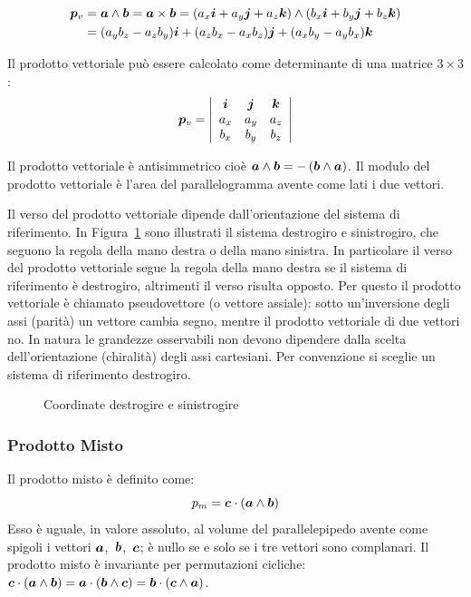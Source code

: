 \begin{align*}
  \boldsymbol{p}_v & =\boldsymbol{a} \wedge \boldsymbol{b}=\boldsymbol{a} \times \boldsymbol{b}=(a_x\boldsymbol{i}+a_y\boldsymbol{j}+a_z\boldsymbol{k})\wedge(b_x\boldsymbol{i}+b_y\boldsymbol{j}+b_z\boldsymbol{k})                                                                       \\
          & =(a_yb_z-a_zb_y)\boldsymbol{i}+(a_zb_x-a_xb_z)\boldsymbol{j}+(a_xb_y-a_yb_x)\boldsymbol{k}
\end{align*}

Il prodotto vettoriale può essere calcolato come determinante di una matrice $3\times 3$:
\[\boldsymbol{p}_v=
  \left| \begin{array}{ccc} \boldsymbol{i} & \boldsymbol{j} & \boldsymbol{k} \\
             a_x         & a_y   & a_z   \\
             b_x         & b_y   & b_z
  \end{array} \right|\]

Il prodotto vettoriale è antisimmetrico cioè $\boldsymbol{a} \wedge \boldsymbol{b}=-\left(\boldsymbol{b} \wedge \boldsymbol{a}\right)$. Il modulo del prodotto
vettoriale è l'area del parallelogramma avente come lati i due
vettori.

Il verso del prodotto vettoriale dipende dall'orientazione del sistema di riferimento.
In Figura~\ref{fig:sistema_destrogiro} sono illustrati il sistema destrogiro e sinistrogiro, che seguono la regola della mano destra o della mano sinistra.
In particolare il verso del prodotto vettoriale segue la regola della mano destra se il sistema di riferimento è destrogiro, altrimenti il verso risulta opposto. Per questo il prodotto vettoriale è chiamato pseudovettore (o vettore assiale): sotto un'inversione degli assi (parità) un vettore cambia segno, mentre il prodotto vettoriale di due vettori no. In natura le grandezze osservabili non devono dipendere dalla scelta dell'orientazione (chiralità) degli assi cartesiani. Per convenzione si sceglie un sistema di riferimento destrogiro.
\begin{figure}[htbp]
  \centering
  \subfigure[destrogiro]{}
  \subfigure[sinistrogiro]{}
  \caption{Coordinate destrogire e sinistrogire}
  \label{fig:sistema_destrogiro}
\end{figure}

\subsubsection{Prodotto Misto}
Il prodotto misto è definito come:
\[p_m=\boldsymbol{c}\cdot\left(\boldsymbol{a} \wedge \boldsymbol{b}\right)\]
Esso è uguale, in valore assoluto, al volume del parallelepipedo avente come spigoli i
vettori \mbox{$\boldsymbol{a}$, $\boldsymbol{b}$, $\boldsymbol{c}$;} è nullo se e solo se i tre vettori sono complanari. Il prodotto misto è invariante per permutazioni cicliche: $\boldsymbol{c}\cdot(\boldsymbol{a}\wedge\boldsymbol{b})=\boldsymbol{a}\cdot(\boldsymbol{b}\wedge\boldsymbol{c})=\boldsymbol{b}\cdot(\boldsymbol{c}\wedge\boldsymbol{a})$.

